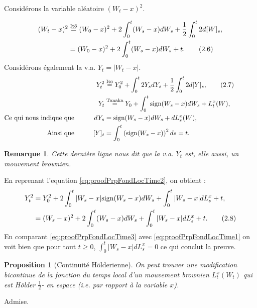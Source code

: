 \documentclass[openany]{book}
\makeatletter
\newcommand{\1}{\mathbbm{1}}
\newcommand{\sign}{\text{sign}}
\renewenvironment{proof}[1][\textbf{\textit{Démonstration}}]{%
  \par\pushQED{\qed}%
  \normalfont\topsep6\p@\@plus6\p@\relax
  \trivlist\item[\hskip\labelsep
    #1\@addpunct{.}]\ignorespaces
}{%
  \popQED\endtrivlist\@endpefalse
}
\theoremstyle{thmfont}
\theoremstyle{deffont}
\theoremstyle{thmfont}
\newtheorem{prop}[prop]{Proposition}
\theoremstyle{deffont}
\newtheorem*{remark}{Remarque}
\makeatother
\begin{document}
\begin{proof}
    Considérons la variable aléatoire $(W_t - x)^2$.

    \begin{align*}
      (W_t -x)^2 &\overset{\text{Itō}}{=} (W_0-x)^2 + 2\int_0^t (W_s -x)dW_s + \dfrac{1}{2} \int_0^t 2 d[W]_s,\\
                 &= (W_0-x)^2 + 2\int_0^t (W_s -x)dW_s + t.  \tag{2.6}\refstepcounter{equation} \label{eq:proofPrpFondLocTime1}
    \end{align*}
    \indent Considérons également la v.a. $Y_t = |W_t-x|$.
    \begin{alignat*}{2}
     && Y_t^2 &\overset{\text{Itō}}{=} Y_0^2 + \int_0^t 2Y_s dY_s + \dfrac{1}{2} \int_0^t 2 d[Y]_s,  \tag{2.7}\refstepcounter{equation}\label{eq:proofPrpFondLocTime2} \\
     && Y_t &\overset{\text{Tanaka}}{=} Y_0 + \int_0^t \sign(W_s -x) dW_s + L_t^x(W),\\
      \text{Ce qui nous indique que}&&\qquad dY_s &=  \sign(W_s -x) dW_s + dL_s^x(W),\qquad\qquad\qquad\qquad\quad\\
     \text{Ainsi que}&& [Y]_t &= \int_0^t \left(\sign(W_s-x)\right)^2 ds = t.\\
    \end{alignat*}
    \begin{remark}Cette dernière ligne nous dit que la v.a. $Y_t$ est, elle aussi, un mouvement brownien.
    \end{remark}
    

    \noindent En reprenant l'equation \eqref{eq:proofPrpFondLocTime2}, on obtient :
    \begin{align*}
      Y_t^2 &= Y_0^2 + 2\int_0^t |W_s - x| \sign(W_s-x) dW_s + \int_0^t |W_s-x| dL_s^x + t,\\
      &= (W_s -x)^2 + 2\int_0^t (W_s -x) dW_s + \int_0^t |W_s -x| dL_s^x + t. \tag{2.8}\refstepcounter{equation}\label{eq:proofPrpFondLocTime3}
    \end{align*}
    En comparant \eqref{eq:proofPrpFondLocTime3} avec \eqref{eq:proofPrpFondLocTime1} on voit bien que pour tout $t\geq0$, $\int_0^t |W_s-x|dL_s^x = 0$ ce qui conclut la preuve.
\end{proof}


  \begin{prop}[Continuité Hölderienne]
    On peut trouver une modification bicontinue de la fonction du temps local d'un mouvement brownien $L_t^x(W_t)$ qui est Hölder $\frac{1}{2}$- en espace (i.e. par rapport à la variable $x$).
  \end{prop}
  \begin{proof}
    Admise.
\end{proof}
\end{document}
